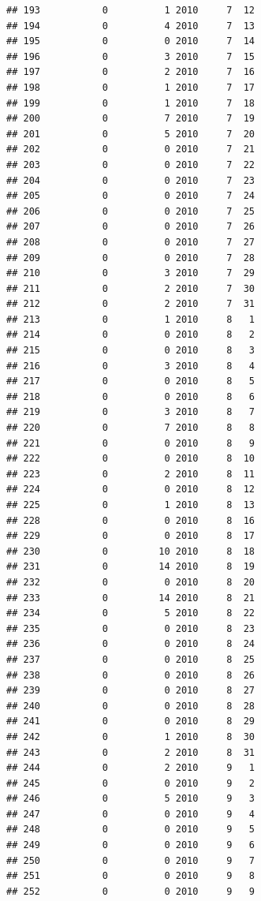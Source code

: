 \documentclass[
]{article}
\begin{document}
\begin{verbatim}
## 193           0          1 2010     7  12
## 194           0          4 2010     7  13
## 195           0          0 2010     7  14
## 196           0          3 2010     7  15
## 197           0          2 2010     7  16
## 198           0          1 2010     7  17
## 199           0          1 2010     7  18
## 200           0          7 2010     7  19
## 201           0          5 2010     7  20
## 202           0          0 2010     7  21
## 203           0          0 2010     7  22
## 204           0          0 2010     7  23
## 205           0          0 2010     7  24
## 206           0          0 2010     7  25
## 207           0          0 2010     7  26
## 208           0          0 2010     7  27
## 209           0          0 2010     7  28
## 210           0          3 2010     7  29
## 211           0          2 2010     7  30
## 212           0          2 2010     7  31
## 213           0          1 2010     8   1
## 214           0          0 2010     8   2
## 215           0          0 2010     8   3
## 216           0          3 2010     8   4
## 217           0          0 2010     8   5
## 218           0          0 2010     8   6
## 219           0          3 2010     8   7
## 220           0          7 2010     8   8
## 221           0          0 2010     8   9
## 222           0          0 2010     8  10
## 223           0          2 2010     8  11
## 224           0          0 2010     8  12
## 225           0          1 2010     8  13
## 228           0          0 2010     8  16
## 229           0          0 2010     8  17
## 230           0         10 2010     8  18
## 231           0         14 2010     8  19
## 232           0          0 2010     8  20
## 233           0         14 2010     8  21
## 234           0          5 2010     8  22
## 235           0          0 2010     8  23
## 236           0          0 2010     8  24
## 237           0          0 2010     8  25
## 238           0          0 2010     8  26
## 239           0          0 2010     8  27
## 240           0          0 2010     8  28
## 241           0          0 2010     8  29
## 242           0          1 2010     8  30
## 243           0          2 2010     8  31
## 244           0          2 2010     9   1
## 245           0          0 2010     9   2
## 246           0          5 2010     9   3
## 247           0          0 2010     9   4
## 248           0          0 2010     9   5
## 249           0          0 2010     9   6
## 250           0          0 2010     9   7
## 251           0          0 2010     9   8
## 252           0          0 2010     9   9

\end{verbatim}
\end{document}
